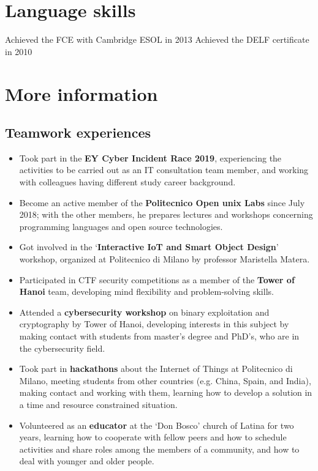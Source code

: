 \section{Language skills}
    {Achieved the FCE with Cambridge ESOL in 2013}
    {Achieved the DELF certificate in 2010}
    {}

\pagebreak

\section{More information}
    \vspace{-0.1cm}
    \sethintscolumnlength{2cm}
    \subsection{Teamwork experiences}
    \begin{itemize}
        \item Took part in the \textbf{EY Cyber Incident Race 2019}, experiencing the activities to be carried out as an IT consultation team member, and working with colleagues having different study career background.
        \item Become an active member of the \textbf{Politecnico Open unix Labs} since July 2018; with the other members, he prepares lectures and workshops concerning programming languages and open source technologies.
        \item Got involved in the ‘\textbf{Interactive IoT and Smart Object Design}’ workshop, organized at Politecnico di Milano by professor Maristella Matera.
        \item Participated in CTF security competitions as a member of the \textbf{Tower of Hanoi} team, developing mind flexibility and problem-solving skills.
        \item Attended a \textbf{cybersecurity workshop} on binary exploitation and cryptography by Tower of Hanoi, developing interests in this subject by making contact with students from master's degree and PhD's, who are in the cybersecurity field.
        \item Took part in \textbf{hackathons} about the Internet of Things at Politecnico di Milano, meeting students from other countries (e.g. China, Spain, and India), making contact and working with them, learning how to develop a solution in a time and resource constrained situation.
        \item Volunteered as an \textbf{educator} at the ‘Don Bosco’ church of Latina for two years, learning how to cooperate with fellow peers and how to schedule activities and share roles among the members of a community, and how to deal with younger and older people.
    \end{itemize}

